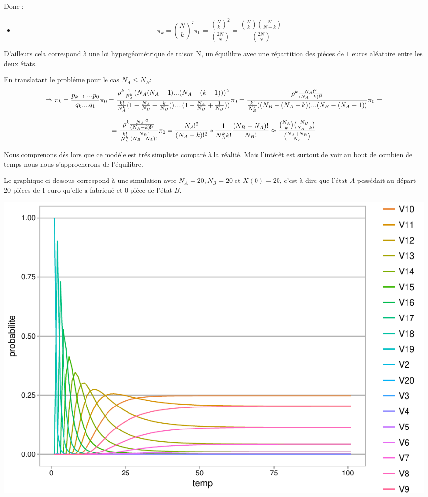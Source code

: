 \documentclass[11pt,]{article}
\providecommand{\tightlist}{%
  \setlength{\itemsep}{0pt}\setlength{\parskip}{0pt}}
\begin{document}
Donc :

\begin{itemize}
\tightlist
\item
  \[\pi_k=\binom{N}{k}^2\pi_0=\frac{\binom{N}{k}^2}{\binom{2N}{N}}=\frac{\binom{N}{k}\binom{N}{N-k}}{\binom{2N}{N}}\]
\end{itemize}

D'ailleurs cela correspond à une loi hypergéométrique de raison N, un
équilibre avec une répartition des piéces de \(1\) euros aléatoire entre
les deux états.

En translatant le probléme pour le cas \(N_A \leq N_B\):\\
\[\Rightarrow \pi_k =\frac{p_{k-1}....p_0}{q_{k}....q_1}\pi_0=\frac{\rho^k\frac{1}{N_A^k}(N_A(N_A-1)...(N_A-(k-1)) )^2}{\frac{k!}{N_A^k}(1-\frac{N_A}{N_B}+\frac{k}{N_B}))....(1-\frac{N_A}{N_B}+\frac{1}{N_B})) }\pi_0\\=\frac{\rho^k \frac{N_A!^2}{(N_A-k)!^2} }{\frac{k!}{N_B^k}((N_B-(N_A-k))...(N_B-(N_A-1))}\pi_0 =\]

\[= \frac{\rho^k \frac{N_A!^2}{(N_A-k)!^2 }}{ \frac{k!}{N_B^k} \frac{N_B!}{(N_B-N_A)!} }\pi_0=
  \frac{N_A!^2}{(N_A-k)!^2} * \frac{1}{N_A^k k!}\frac{(N_B-N_A)!}{N_B!}\\
   \approx \frac{\binom{N_A}{k}\binom{N_B}{N_A-k}}{\binom{N_A+N_B}{N_A}}\]

Nous comprenons dés lors que ce modéle est trés simpliste comparé à la
réalité. Mais l'intérêt est surtout de voir au bout de combien de temps
nous nous s'approcherons de l'équilibre.

Le graphique ci-dessous correspond à une simulation avec
\(N_A=20, N_B=20\) et \(X(0)=20\), c'est à dire que l'état \(A\)
possédait au départ 20 piéces de \(1\) euro qu'elle a fabriqué et 0
piéce de l'état \(B\).

\includegraphics{money_exchange_files/figure-latex/unnamed-chunk-3-1.pdf}
\end{document}
